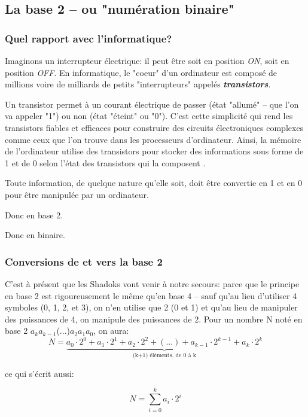 \documentclass[12pt]{article}
\begin{document}
	\subsection{La base 2 -- ou "numération binaire"}
	
	\subsubsection*{Quel rapport avec l'informatique?}
	
	Imaginons un interrupteur électrique: il peut être soit en position \textit{ON}, soit en position \textit{OFF}. En informatique, le "coeur" d'un ordinateur est composé de millions voire de milliards de petits "interrupteurs" appelés \textbf{\textit{transistors}}.
	
	Un transistor permet à un courant électrique de passer (état "allumé" -- que l'on va appeler "1") ou non (état "éteint" ou "0"). C’est cette simplicité qui rend les transistors fiables et efficaces pour construire des circuits électroniques complexes comme ceux que l'on trouve dans les processeurs d’ordinateur. Ainsi, la mémoire de l’ordinateur utilise des transistors pour stocker des informations sous forme de 1 et de 0 selon l'état des transistors qui la composent .
	
	Toute information, de quelque nature qu'elle soit, doit être convertie en 1 et en 0 pour être manipulée par un ordinateur.
	
	Donc en base 2.
	
	Donc en binaire.
	
	\subsubsection*{Conversions de et vers la base 2}
	
	C'est à présent que les Shadoks vont venir à notre secours: parce que le principe en base 2 est rigoureusement le même qu'en base 4 -- sauf qu'au lieu d'utiliser 4 symboles (0, 1, 2, et 3), on n'en utilise que 2 (0 et 1) et qu'au lieu de manipuler des puissances de 4, on manipule des puissances de 2. Pour un nombre N noté en base 2 \( a_k \)\( a_{k-1} \)(...)\( a_2 \)\( a_1 \)\( a_0 \), on aura:
	\[ N = \underbrace{a_0 \cdot 2^0 + a_1 \cdot 2^1 + a_2 \cdot 2^2 + (...) + a_{k-1} \cdot 2^{k-1} + a_k \cdot 2^k}_{\text{(k+1)\ éléments, de 0 à k}}\]
	
	ce qui s'écrit aussi:
	
	\[ N = \sum_{i=0}^{k} a_i \cdot 2^i \]
	
\end{document}
